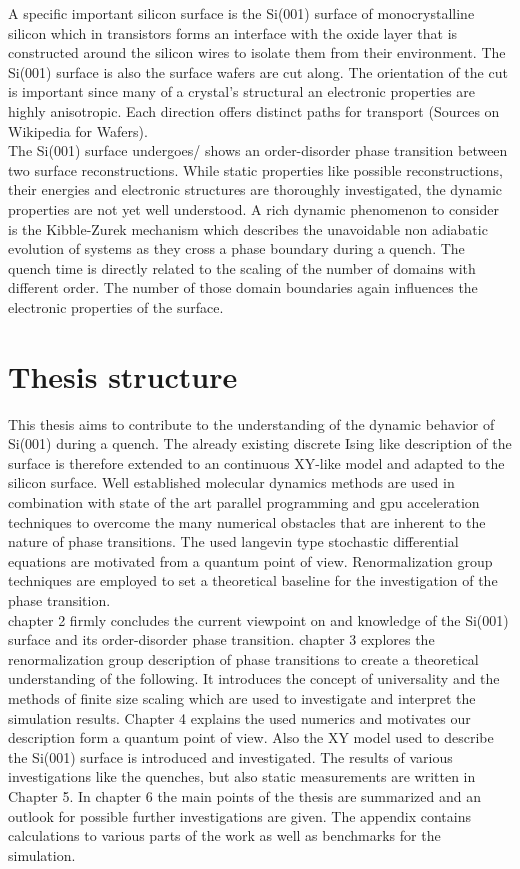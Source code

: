 	A specific important silicon surface is the Si(001) surface of monocrystalline silicon which in transistors forms an interface with the oxide layer that is constructed around the silicon wires to isolate them from their environment. The Si(001) surface is also the surface wafers are cut along. The orientation of the cut is important since many of a crystal's structural an electronic properties are highly anisotropic. Each direction offers distinct paths for transport (Sources on Wikipedia for Wafers). \\
	
	The Si(001) surface undergoes/ shows an order-disorder phase transition between two surface reconstructions. While static properties like possible reconstructions, their energies and electronic structures are thoroughly investigated, the dynamic properties are not yet well understood. A rich dynamic phenomenon to consider is the Kibble-Zurek mechanism which describes the unavoidable non adiabatic evolution of systems as they cross a phase boundary during a quench. The quench time is directly related to the scaling of the number of domains with different order. The number of those domain boundaries again influences the electronic properties of the surface. \\
	
	\section{Thesis structure}
	This thesis aims to contribute to the understanding of the dynamic behavior of Si(001) during a quench. The already existing discrete Ising like description of the surface is therefore extended to an continuous XY-like model and adapted to the silicon surface. Well established molecular dynamics methods are used in combination with state of the art parallel programming and gpu acceleration techniques to overcome the many numerical obstacles that are inherent to the nature of phase transitions. The used langevin type stochastic differential equations are motivated from a quantum point of view. Renormalization group techniques are employed to set a theoretical baseline for the investigation of the phase transition. \\
	
	chapter 2 firmly concludes the current viewpoint on and knowledge of the Si(001) surface and its order-disorder phase transition. chapter 3 explores the renormalization group description of phase transitions to create a theoretical understanding of the following. It introduces the concept of universality and the methods of finite size scaling which are used to investigate and interpret the simulation results.  Chapter 4 explains the used numerics and motivates our description form a quantum point of view. Also the XY model used to describe the Si(001) surface is introduced and investigated. The results of various investigations like the quenches, but also static measurements are written in Chapter 5. In chapter 6 the main points of the thesis are summarized and an outlook for possible further investigations are given. The appendix contains calculations to various parts of the work as well as benchmarks for the simulation. \\
	
